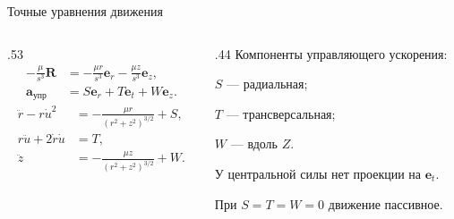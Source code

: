 \documentclass[11pt,aspectratio=169,t]{beamer}
\begin{document}
\begin{frame}{Точные уравнения движения}
\relax
\begin{columns}[T,onlytextwidth]
\begin{column}{.53\textwidth}
{\derivationmathspacing
\[
\begin{aligned}
 -\frac{\mu}{s^3}\boldsymbol R
 &=-\frac{\mu r}{s^3}\boldsymbol e_r-\frac{\mu z}{s^3}\boldsymbol e_z,\\[4pt]
 \boldsymbol a_{\text{упр}}&=S\boldsymbol e_r+T\boldsymbol e_t+W\boldsymbol e_z.
\end{aligned}
\]
\[
\boxed{\begin{aligned}
 \ddot r-r\dot u^2&=-\frac{\mu r}{(r^2+z^2)^{3/2}}+S,\\[7pt]
 r\ddot u+2\dot r\dot u&=T,\\[7pt]
 \ddot z&=-\frac{\mu z}{(r^2+z^2)^{3/2}}+W.
\end{aligned}}
\]
}
\end{column}
\begin{column}{.44\textwidth}
\RaggedRight
Компоненты управляющего ускорения:\par\smallskip
$S$ — радиальная;\par
$T$ — трансверсальная;\par
$W$ — вдоль $Z$.\par\medskip
У центральной силы нет проекции на $\boldsymbol e_t$.\par\medskip
При $S=T=W=0$ движение пассивное.
\end{column}
\end{columns}
\end{frame}
\end{document}
